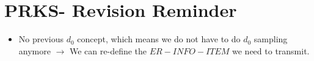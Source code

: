 \section {PRKS- Revision Reminder}
\begin{itemize}
  \item No previous $d_0$ concept, which means we do not have to do $d_0$ sampling anymore $\rightarrow$ We can re-define the $ER-INFO-ITEM$ we need to transmit.
\end{itemize}
